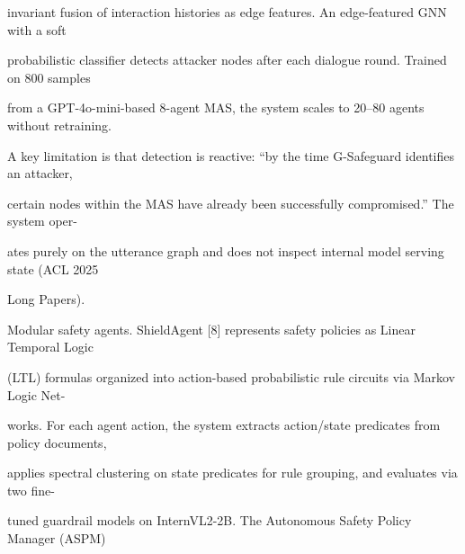 \begin{flushleft}
\noindent invariant fusion of interaction histories as edge features. An edge-featured GNN with a soft\par
\noindent probabilistic classifier detects attacker nodes after each dialogue round. Trained on 800 samples\par
\noindent from a GPT-4o-mini-based 8-agent MAS, the system scales to 20–80 agents without retraining.\par
\noindent A key limitation is that detection is reactive: “by the time G-Safeguard identifies an attacker,\par
\noindent certain nodes within the MAS have already been successfully compromised.” The system oper-\par
\noindent ates purely on the utterance graph and does not inspect internal model serving state (ACL 2025\par
\noindent Long Papers).\par
\par\smallskip
\noindent Modular safety agents. ShieldAgent [8] represents safety policies as Linear Temporal Logic\par
\noindent (LTL) formulas organized into action-based probabilistic rule circuits via Markov Logic Net-\par
\noindent works. For each agent action, the system extracts action/state predicates from policy documents,\par
\noindent applies spectral clustering on state predicates for rule grouping, and evaluates via two fine-\par
\noindent tuned guardrail models on InternVL2-2B. The Autonomous Safety Policy Manager (ASPM)\par
\end{flushleft}
